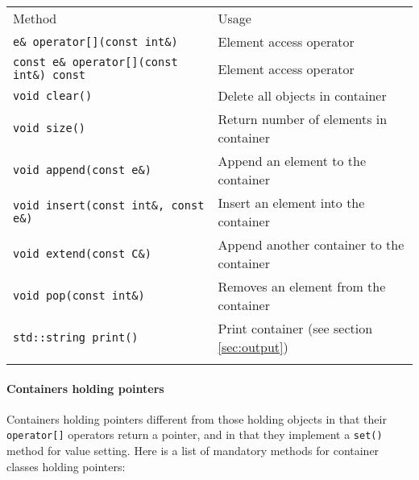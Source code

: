 \documentclass{article}[12pt,a4]
\begin{document}
\begin{center}
\begin{tabular}{ll}
\hline
\hline
\noalign{\smallskip}
Method & Usage \\
\noalign{\smallskip}
\hline
\noalign{\smallskip}
{\tt e\& operator[](const int\&)} & Element access operator \\
{\tt const e\& operator[](const int\&) const} & Element access operator \\
{\tt void clear()} & Delete all objects in container \\
{\tt void size()} & Return number of elements in container \\
{\tt void append(const e\&)} & Append an element to the container \\
{\tt void insert(const int\&, const e\&)} & Insert an element into the container \\
{\tt void extend(const C\&)} & Append another container to the container \\
{\tt void pop(const int\&)} & Removes an element from the container \\
{\tt std::string print()} & Print container (see section \ref{sec:output}) \\
\noalign{\smallskip}
\hline
\end{tabular}
\end{center}


\paragraph{Containers holding pointers}

Containers holding pointers different from those holding objects in that their {\tt operator[]}
operators return a pointer, and in that they implement a {\tt set()} method for value setting.
Here is a list of mandatory methods for container classes holding pointers:
\end{document}
